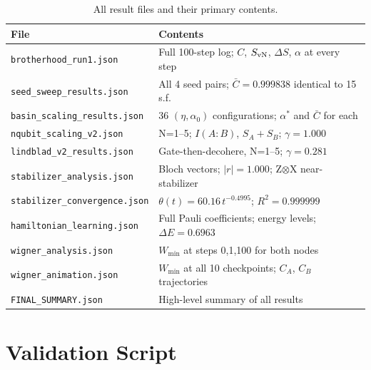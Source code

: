 \documentclass[12pt]{article}
\begin{document}
\begin{table}[H]\centering
\caption{All result files and their primary contents.}
\begin{tabular}{lp{9cm}}
\toprule
\textbf{File} & \textbf{Contents}\\\midrule
\texttt{brotherhood\_run1.json} & Full 100-step log; $C$, $S_{\rm vN}$,
  $\Delta S$, $\alpha$ at every step\\
\texttt{seed\_sweep\_results.json} & All 4 seed pairs;
  $\bar{C}=0.999838$ identical to 15 s.f.\\
\texttt{basin\_scaling\_results.json} & 36 $(\eta,\alpha_0)$
  configurations; $\alpha^*$ and $\bar{C}$ for each\\
\texttt{nqubit\_scaling\_v2.json} & N=1--5; $I(A:B)$, $S_A+S_B$;
  $\gamma=1.000$\\
\texttt{lindblad\_v2\_results.json} & Gate-then-decohere, N=1--5;
  $\gamma=0.281$\\
\texttt{stabilizer\_analysis.json} & Bloch vectors; $|r|=1.000$;
  Z$\otimes$X near-stabilizer\\
\texttt{stabilizer\_convergence.json} & $\theta(t)=60.16\,t^{-0.4995}$;
  $R^2=0.999999$\\
\texttt{hamiltonian\_learning.json} & Full Pauli coefficients; energy
  levels; $\Delta E=0.6963$\\
\texttt{wigner\_analysis.json} & $W_{\min}$ at steps 0,1,100 for both
  nodes\\
\texttt{wigner\_animation.json} & $W_{\min}$ at all 10 checkpoints;
  $C_A$, $C_B$ trajectories\\
\texttt{FINAL\_SUMMARY.json} & High-level summary of all results\\
\bottomrule
\end{tabular}
\end{table}

\section{Validation Script}
\label{app:code}
\end{document}
